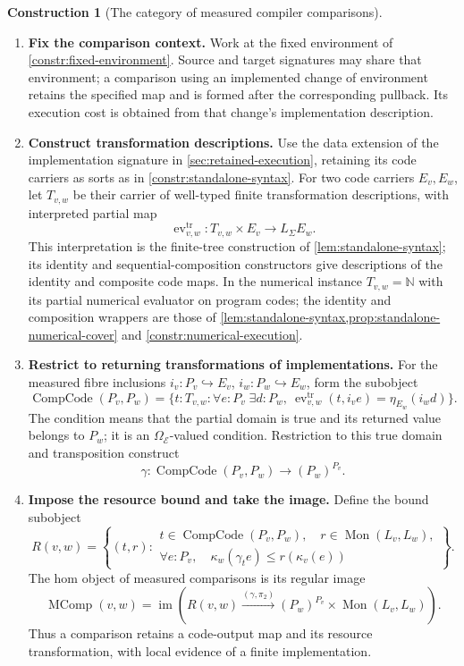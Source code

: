 \documentclass[11pt,a4paper]{article}
\numberwithin{algorithm}{section}
\numberwithin{equation}{section}
\theoremstyle{definition}
\theoremstyle{remark}
\theoremstyle{plain}
\newcommand{\E}{\mathcal E}
\newcommand{\Truth}{\Omega_{\E}}
\newcommand{\N}{\mathbb N}
\newcommand{\LL}{L_{\Sigma}}
\newcommand{\incl}{\hookrightarrow}
\newcommand{\im}{\operatorname{im}}
\newcommand{\MComp}{\operatorname{MComp}}
\theoremstyle{definition}
\newtheorem{construction}[construction]{Construction}
\theoremstyle{plain}
\begin{document}
\begin{construction}[The category of measured compiler comparisons]
\label{constr:measured-compilers}\leavevmode
\begin{enumerate}[leftmargin=*,align=left]
\item \textbf{Fix the comparison context.}
Work at the fixed environment of \cref{constr:fixed-environment}.
Source and target signatures may share that environment; a comparison
using an implemented change of environment retains the specified map
and is formed after the corresponding pullback. Its execution cost is
obtained from that change's implementation description.
\item \textbf{Construct transformation descriptions.}
Use the data extension of the implementation signature in
\cref{sec:retained-execution}, retaining its code carriers as sorts
as in \cref{constr:standalone-syntax}. For two code carriers
$E_v,E_w$, let $T_{v,w}$ be their carrier of well-typed
finite transformation descriptions, with interpreted partial map
\[
 \operatorname{ev}^{\mathrm{tr}}_{v,w}:T_{v,w}\times E_v\to\LL E_w.
\]
This interpretation is the finite-tree construction of \cref{lem:standalone-syntax}; its
identity and sequential-composition constructors give descriptions
of the identity and composite code maps. In the numerical instance
$T_{v,w}=\N$ with its partial numerical evaluator on program codes;
the identity and composition wrappers are those of \cref{lem:standalone-syntax,prop:standalone-numerical-cover} and
\cref{constr:numerical-execution}.
\item \textbf{Restrict to returning transformations of implementations.}
For the measured fibre inclusions $i_v:P_v\incl E_v$,
$i_w:P_w\incl E_w$, form the
subobject
\[
 \operatorname{CompCode}(P_v,P_w)=
 \{t:T_{v,w}:\forall e:P_v\;\exists d:P_w,\
    \operatorname{ev}^{\mathrm{tr}}_{v,w}(t,i_v e)=\eta_{E_w}(i_wd)\}.
\]
The condition means that the partial domain is true and its returned
value belongs to $P_w$; it is an $\Truth$-valued condition. Restriction
to this true domain and transposition construct
\[
 \gamma:\operatorname{CompCode}(P_v,P_w)\to(P_w)^{P_v}.
\]
\item \textbf{Impose the resource bound and take the image.}
Define the bound subobject
\[
 R(v,w)=\left\{(t,r):\begin{array}{l}
 t\in\operatorname{CompCode}(P_v,P_w),\quad
 r\in\operatorname{Mon}(L_v,L_w),\\
 \forall e:P_v,\quad\kappa_w(\gamma_t e)\le r(\kappa_v(e))
 \end{array}\right\}.
\]
The hom object of measured comparisons is its regular image
\begin{equation}\label{eq:measured-compilers-object}
 \MComp(v,w)=\im\left(
 R(v,w)\xrightarrow{(\gamma,\pi_2)}
 (P_w)^{P_v}\times\operatorname{Mon}(L_v,L_w)\right).
\end{equation}
Thus a comparison retains a code-output map and its resource
transformation, with local evidence of a finite implementation.


\end{enumerate}
\end{construction}
\end{document}
